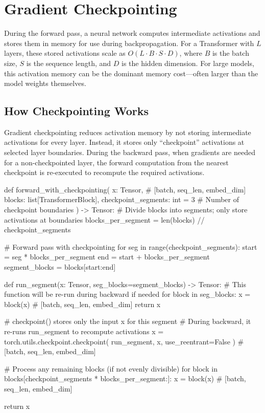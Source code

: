\section{Gradient Checkpointing}

During the forward pass, a neural network computes intermediate
activations and stores them in memory for use during backpropagation.
For a Transformer with $L$ layers, these stored activations scale as
$O(L \cdot B \cdot S \cdot D)$, where $B$ is the batch size, $S$ is
the sequence length, and $D$ is the hidden dimension. For large models,
this activation memory can be the dominant memory cost---often larger
than the model weights themselves.

\subsection{How Checkpointing Works}

Gradient checkpointing reduces activation memory by not storing
intermediate activations for every layer. Instead, it stores only
``checkpoint'' activations at selected layer boundaries. During the
backward pass, when gradients are needed for a non-checkpointed layer,
the forward computation from the nearest checkpoint is re-executed to
recompute the required activations.

\begin{pseudocode}
def forward_with_checkpointing(
        x: Tensor,                 # [batch, seq_len, embed_dim]
        blocks: list[TransformerBlock],
        checkpoint_segments: int = 3  # Number of checkpoint boundaries
    ) -> Tensor:
    # Divide blocks into segments; only store activations at boundaries
    blocks_per_segment = len(blocks) // checkpoint_segments

    # Forward pass with checkpointing
    for seg in range(checkpoint_segments):
        start = seg * blocks_per_segment
        end = start + blocks_per_segment
        segment_blocks = blocks[start:end]

        def run_segment(x: Tensor, seg_blocks=segment_blocks) -> Tensor:
            # This function will be re-run during backward if needed
            for block in seg_blocks:
                x = block(x)      # [batch, seq_len, embed_dim]
            return x

        # checkpoint() stores only the input x for this segment
        # During backward, it re-runs run_segment to recompute activations
        x = torch.utils.checkpoint.checkpoint(
            run_segment, x, use_reentrant=False
        )  # [batch, seq_len, embed_dim]

    # Process any remaining blocks (if not evenly divisible)
    for block in blocks[checkpoint_segments * blocks_per_segment:]:
        x = block(x)              # [batch, seq_len, embed_dim]

    return x
\end{pseudocode}

